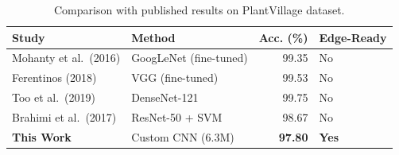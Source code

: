 \begin{table}[H]
  \centering
  \caption{Comparison with published results on PlantVillage dataset.}
  \label{tab:comparison}
  \begin{tabular}{@{}llrl@{}}
    \toprule
    \textbf{Study} & \textbf{Method} & \textbf{Acc. (\%)} & \textbf{Edge-Ready} \\
    \midrule
    Mohanty et al.\ (2016) & GoogLeNet (fine-tuned) & 99.35 & No \\
    Ferentinos (2018)      & VGG (fine-tuned)      & 99.53 & No \\
    Too et al.\ (2019)     & DenseNet-121          & 99.75 & No \\
    Brahimi et al.\ (2017) & ResNet-50 + SVM       & 98.67 & No \\
    \textbf{This Work}     & Custom CNN (6.3M)     & \textbf{97.80} & \textbf{Yes} \\
    \bottomrule
  \end{tabular}
\end{table}

